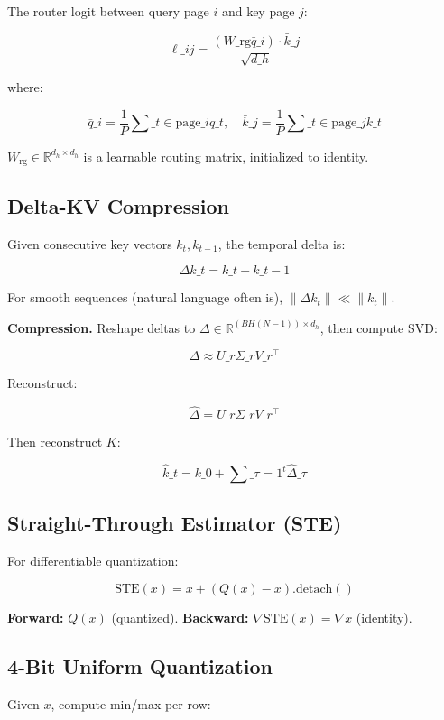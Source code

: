 The router logit between query page $i$ and key page $j$:

\[
\ell\_{ij} = \frac{(W\_\text{rg} \bar{q}\_i) \cdot \bar{k}\_j}{\sqrt{d\_h}}
\tag{3.5}
\]

where:

\[
\bar{q}\_i = \frac{1}{P} \sum\_{t \in \text{page}\_i} q\_t, \quad
\bar{k}\_j = \frac{1}{P} \sum\_{t \in \text{page}\_j} k\_t
\tag{3.6}
\]

$W_\text{rg} \in \mathbb{R}^{d_h \times d_h}$ is a learnable routing matrix, 
initialized to identity.

\subsection{Delta-KV Compression}

Given consecutive key vectors $k_t, k_{t-1}$, the temporal delta is:

\[
\Delta k\_t = k\_t - k\_{t-1}
\tag{3.7}
\]

For smooth sequences (natural language often is), $\|\Delta k_t\| \ll \|k_t\|$.

\textbf{Compression.} Reshape deltas to $\Delta \in \mathbb{R}^{(B H (N-1)) \times d_h}$, 
then compute SVD:

\[
\Delta \approx U\_r \Sigma\_r V\_r^\top
\tag{3.8}
\]

Reconstruct:

\[
\hat{\Delta} = U\_r \Sigma\_r V\_r^\top
\tag{3.9}
\]

Then reconstruct $K$:

\[
\hat{k}\_t = k\_0 + \sum\_{\tau=1}^t \hat{\Delta}\_\tau
\tag{3.10}
\]

\subsection{Straight-Through Estimator (STE)}

For differentiable quantization:

\[
\text{STE}(x) = x + (Q(x) - x).\text{detach}()
\tag{3.11}
\]

\textbf{Forward:} $Q(x)$ (quantized).
\textbf{Backward:} $\nabla \text{STE}(x) = \nabla x$ (identity).

\subsection{4-Bit Uniform Quantization}

Given $x$, compute min/max per row:

